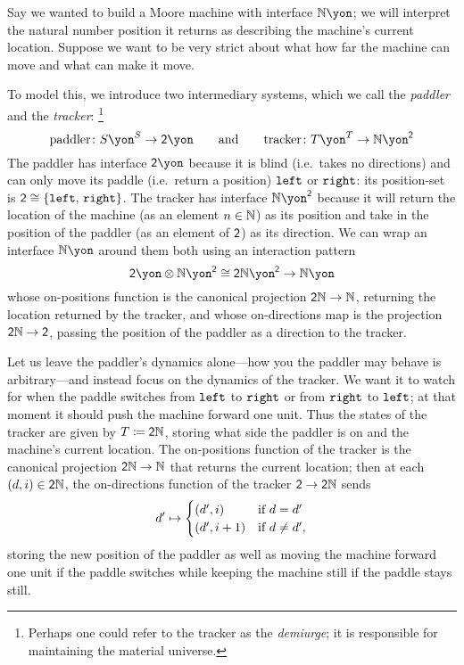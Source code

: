 \documentclass[Book-Poly]{subfiles}
\begin{document}
\begin{example}[Paddling]\label{ex.paddler}
Say we wanted to build a Moore machine with interface $\nn\yon$; we will interpret the natural number position it returns as describing the machine's current location.
Suppose we want to be very strict about what how far the machine can move and what can make it move.

To model this, we introduce two intermediary systems, which we call the \emph{paddler} and the \emph{tracker}:%
\footnote{Perhaps one could refer to the tracker as the \emph{demiurge}; it is responsible for maintaining the material universe.}
\[
  \text{paddler}\colon S\yon^S\to\2\yon
  \qqand
  \text{tracker}\colon T\yon^T\to\nn\yon^\2
\]
The paddler has interface $\2\yon$ because it is blind (i.e.\ takes no directions) and can only move its paddle (i.e.\ return a position) $\texttt{left}$ or $\texttt{right}$: its position-set is $\textsf{2}\cong\{\texttt{left},\,\texttt{right}\}$. The tracker has interface $\nn\yon^\2$ because it will return the location of the machine (as an element $n\in\mathbb{N}$) as its position and take in the position of the paddler (as an element of $\textsf{2}$) as its direction.
We can wrap an interface $\nn\yon$ around them both using an interaction pattern
\[
    \2\yon\otimes\nn\yon^\2\iso\2\nn\yon^\2\to\nn\yon
\]
whose on-positions function is the canonical projection $\textsf{2}\mathbb{N}\to\mathbb{N}$, returning the location returned by the tracker, and whose on-directions map is the projection $\textsf{2}\mathbb{N}\to\textsf{2}$, passing the position of the paddler as a direction to the tracker.


Let us leave the paddler's dynamics alone---how you the paddler may behave is arbitrary---and instead focus on the dynamics of the tracker.
We want it to watch for when the paddle switches from $\texttt{left}$ to $\texttt{right}$ or from $\texttt{right}$ to $\texttt{left}$; at that moment it should push the machine forward one unit. Thus the states of the tracker are given by $T\coloneqq\textsf{2}\mathbb{N}$, storing what side the paddler is on and the machine's current location.
The on-positions function of the tracker is the canonical projection $\textsf{2}\mathbb{N}\to\mathbb{N}$ that returns the current location; then at each $(d,i)\in\textsf{2}\mathbb{N}$, the on-directions function of the tracker $\textsf{2}\to\textsf{2}\mathbb{N}$ sends
\[
  d'\mapsto
	\begin{cases}
		(d',i)&\textnormal{if }d=d'\\
		(d',i+1)&\textnormal{if }d\neq d',
	\end{cases}
\]
storing the new position of the paddler as well as moving the machine forward one unit if the paddle switches while keeping the machine still if the paddle stays still.
\end{example}
\end{document}

